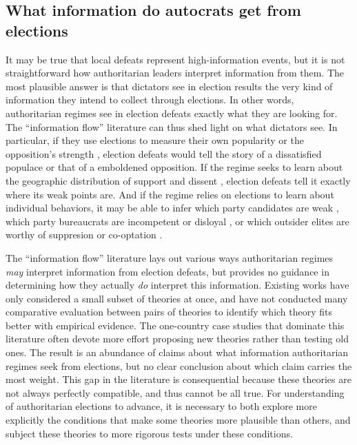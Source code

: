 \documentclass[12pt]{article}\usepackage[]{graphicx}\usepackage[]{color}
\newcommand{\1}{\mathbbm{1}}
\begin{document}
\subsection{What information do autocrats get from elections}
It may be true that local defeats represent high-information events, but it is not straightforward how authoritarian leaders interpret information from them. The most plausible answer is that dictators see in election results the very kind of information they intend to collect through elections. In other words, authoritarian regimes see in election defeats exactly what they are looking for. The ``information flow'' literature can thus shed light on what dictators see. In particular, if they use elections to measure their own popularity \citep{Miller2015} or the opposition's strength \citep{Geddes2005}, election defeats would tell the story of a dissatisfied populace or that of a emboldened opposition. If the regime seeks to learn about the geographic distribution of support and dissent \citep{Magaloni2006, Blaydes2008}, election defeats tell it exactly where its weak points are. And if the regime relies on elections to learn about individual behaviors, it may be able to infer which party candidates are weak \citep{someone}, which party bureaucrats are incompetent or disloyal \citep{Magaloni2006, Blaydes2008}, or which outsider elites are worthy of suppresion or co-optation \citep{LustOkar2005}.

The ``information flow'' literature lays out various ways authoritarian regimes \textit{may} interpret information from election defeats, but provides no guidance in determining how they actually \textit{do} interpret this information. Existing works have only considered a small subset of theories at once, and have not conducted many comparative evaluation between pairs of theories to identify which theory fits better with empirical evidence. The one-country case studies that dominate this literature \citep{LustOkar2005, Geddes2005, Magaloni2006, Blaydes2008} often devote more effort proposing new theories rather than testing old ones. The result is an abundance of claims about what information authoritarian regimes seek from elections, but no clear conclusion about which claim carries the most weight. This gap in the literature is consequential because these theories are not always perfectly compatible, and thus cannot be all true. For understanding of authoritarian elections to advance, it is necessary to both explore more explicitly the conditions that make some theories more plausible than others, and subject these theories to more rigorous tests under these conditions.
\end{document}

